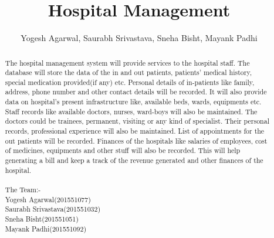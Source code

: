 \documentclass[11pt]{article}
\begin{document}
\title{Hospital Management}
\author{Yogesh Agarwal, Saurabh Srivastava, Sneha Bisht, Mayank Padhi}
\maketitle

\begin{abstract}
The hospital management system will provide services to the hospital staff. The database will store the data of the in and out patients, patients' medical history, special medication provided(if any) etc. Personal details of in-patients like family, address, phone number and other contact details will be recorded. It will also provide data on hospital's present infrastructure like, available beds, wards, equipments etc. Staff records like available doctors, nurses, ward-boys will also be maintained. The doctors could be trainees, permanent, visiting or any kind of specialist. Their personal records, professional experience will also be maintained. List of appointments for the out patients will be recorded. Finances of the hospitals like salaries of employees, cost of medicines, equipments and other stuff will also be recorded. This will help generating a bill and keep a track of the revenue generated and other finances of the hospital.
\\
\\
The Team:-\\
Yogesh Agarwal(201551077)\\
Saurabh Srivastava(201551032)\\
Sneha Bisht(201551051)\\
Mayank Padhi(201551092)\\
\end{abstract}
\end{document}

